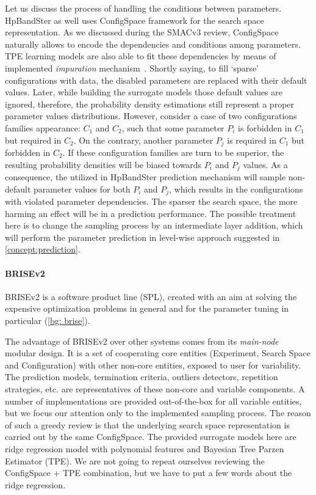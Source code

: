 Let us discuss the process of handling the conditions between parameters. HpBandSter as well uses ConfigSpace framework for the search space representation. As we discussed during the SMACv3 review, ConfigSpace naturally allows to encode the dependencies and conditions among parameters. TPE learning models are also able to fit these dependencies by means of implemented \emph{impuration} mechanism~\cite{levesque2017bayesian}. Shortly saying, to fill `sparse' configurations with data, the disabled parameters are replaced with their default values. Later, while building the surrogate models those default values are ignored, therefore, the probability density estimations still represent a proper parameter values distributions. However, consider a case of two configurations families appearance: $C_1$ and $C_2$, such that some parameter $P_i$ is forbidden in $C_1$ but required in $C_2$. On the contrary, another parameter $P_j$ is required in $C_1$ but forbidden in $C_2$. If these configuration families are turn to be superior, the resulting probability densities will be biased towards $P_i$ and $P_j$ values. As a consequence, the utilized in HpBandSter prediction mechanism will sample non-default parameter values for both $P_i$ and $P_j$, which results in the configurations with violated parameter dependencies. The sparser the search space, the more harming an effect will be in a prediction performance. The possible treatment here is to change the sampling process by an intermediate layer addition, which will perform the parameter prediction in level-wise approach suggested in \cref{concept:prediction}.

\paragraph{BRISEv2}
BRISEv2 is a software product line (SPL), created with an aim at solving the expensive optimization problems in general and for the parameter tuning in particular (\cref{bg: brise}).

The advantage of BRISEv2 over other systems comes from its \emph{main-node} modular design. It is a set of cooperating core entities (Experiment, Search Space and Configuration) with other non-core entities, exposed to user for variability. The prediction models, termination criteria, outliers detectors, repetition strategies, etc. are representatives of these non-core and variable components. A number of implementations are provided out-of-the-box for all variable entities, but we focus our attention only to the implemented sampling process. The reason of such a greedy review is that the underlying search space representation is carried out by the same ConfigSpace. The provided surrogate models here are ridge regression model with polynomial features and Bayesian Tree Parzen Estimator (TPE). We are not going to repeat ourselves reviewing the ConfigSpace + TPE combination, but we have to put a few words about the ridge regression.

